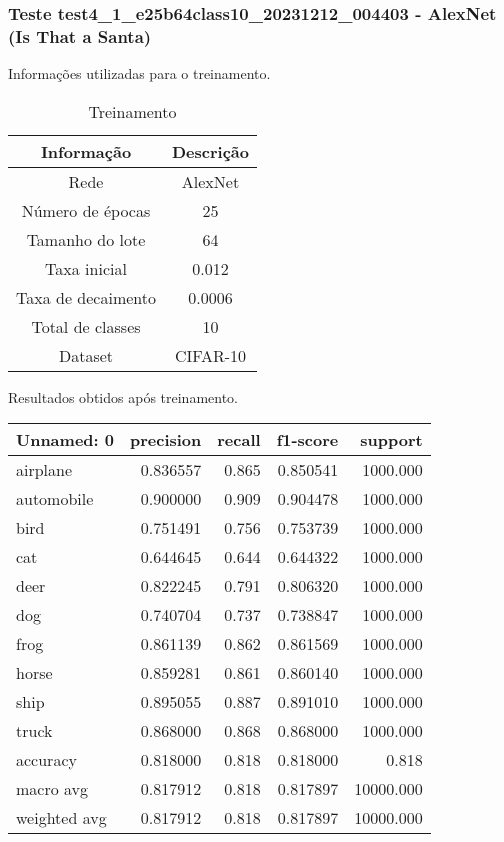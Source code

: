 \subsubsection{Teste test4_1_e25b64class10_20231212_004403 - AlexNet (Is That a Santa)}

Informações utilizadas para o treinamento.

\begin{table}[ht]
   \centering
   \caption{Treinamento}
   \label{tab:modelos}
   \begin{tabular}{| c | c | }
      \hline 
      \textbf{Informação} & \textbf{Descrição} \\
      \hline \hline 
      Rede & AlexNet \\
      \hline
      Número de épocas & 25\\
      \hline
      Tamanho do lote & 64\\
      \hline
      Taxa inicial & 0.012 \\
      \hline
      Taxa de decaimento & 0.0006 \\
      \hline
      Total de classes & 10\\
      \hline
      Dataset & CIFAR-10\\
      \hline
   \end{tabular} 
\end{table}

Resultados obtidos após treinamento.

\begin{tabular}{lrrrr}
\toprule
  Unnamed: 0 &  precision &  recall &  f1-score &   support \\
\midrule
    airplane &   0.836557 &   0.865 &  0.850541 &  1000.000 \\
  automobile &   0.900000 &   0.909 &  0.904478 &  1000.000 \\
        bird &   0.751491 &   0.756 &  0.753739 &  1000.000 \\
         cat &   0.644645 &   0.644 &  0.644322 &  1000.000 \\
        deer &   0.822245 &   0.791 &  0.806320 &  1000.000 \\
         dog &   0.740704 &   0.737 &  0.738847 &  1000.000 \\
        frog &   0.861139 &   0.862 &  0.861569 &  1000.000 \\
       horse &   0.859281 &   0.861 &  0.860140 &  1000.000 \\
        ship &   0.895055 &   0.887 &  0.891010 &  1000.000 \\
       truck &   0.868000 &   0.868 &  0.868000 &  1000.000 \\
    accuracy &   0.818000 &   0.818 &  0.818000 &     0.818 \\
   macro avg &   0.817912 &   0.818 &  0.817897 & 10000.000 \\
weighted avg &   0.817912 &   0.818 &  0.817897 & 10000.000 \\
\bottomrule
\end{tabular}


